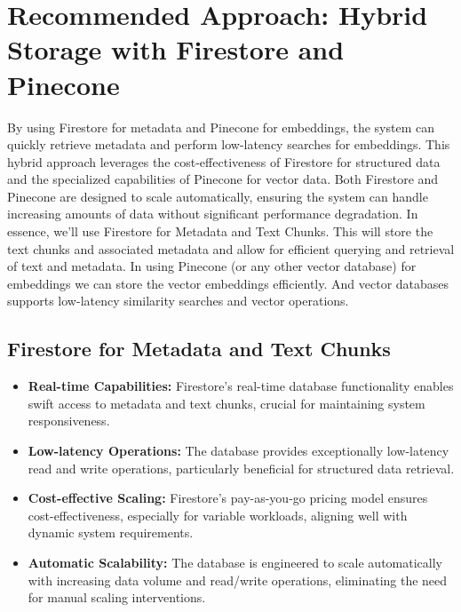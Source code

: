 \documentclass[a4paper, 12pt]{report}
\begin{document}
\section{Recommended Approach: Hybrid Storage with Firestore and Pinecone}

By using Firestore for metadata and Pinecone for embeddings, the system can quickly retrieve metadata and perform low-latency searches for embeddings. This hybrid approach leverages the cost-effectiveness of Firestore for structured data and the specialized capabilities of Pinecone for vector data. Both Firestore and Pinecone are designed to scale automatically, ensuring the system can handle increasing amounts of data without significant performance degradation. In essence, we'll use Firestore for Metadata and Text Chunks. This will store the text chunks and associated metadata and allow for efficient querying and retrieval of text and metadata. In using Pinecone (or any other vector database) for embeddings we can store the vector embeddings efficiently. And vector databases supports low-latency similarity searches and vector operations.

\subsection*{Firestore for Metadata and Text Chunks}
\begin{itemize}
    \item \textbf{Real-time Capabilities:} Firestore's real-time database functionality enables swift access to metadata and text chunks, crucial for maintaining system responsiveness.
    \item \textbf{Low-latency Operations:} The database provides exceptionally low-latency read and write operations, particularly beneficial for structured data retrieval.
    \item \textbf{Cost-effective Scaling:} Firestore's pay-as-you-go pricing model ensures cost-effectiveness, especially for variable workloads, aligning well with dynamic system requirements.
    \item \textbf{Automatic Scalability:} The database is engineered to scale automatically with increasing data volume and read/write operations, eliminating the need for manual scaling interventions.
\end{itemize}
\end{document}
